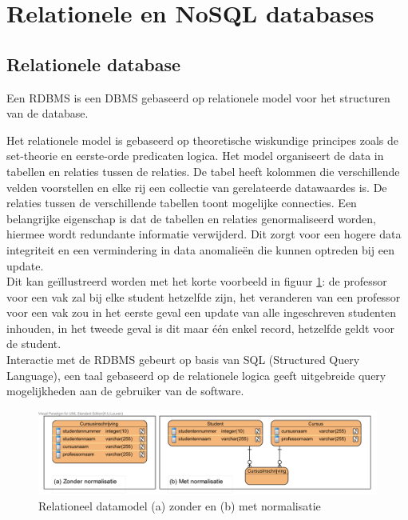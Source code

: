 \section{Relationele en NoSQL databases} 
\subsection{Relationele database}
Een R\gls{DBMS} is een \gls{DBMS} gebaseerd op relationele model voor het structuren van de database.

Het relationele model is gebaseerd op theoretische wiskundige principes zoals de set-theorie en eerste-orde predicaten logica. Het model organiseert de data in tabellen en relaties tussen de relaties. De tabel heeft kolommen die verschillende velden voorstellen en elke rij een collectie van gerelateerde datawaardes is. De relaties tussen de verschillende tabellen toont mogelijke connecties. Een belangrijke eigenschap is dat de tabellen en relaties genormaliseerd worden, hiermee wordt redundante informatie verwijderd. Dit zorgt voor een hogere data integriteit en een vermindering in data anomalieën die kunnen optreden bij een update.\cite{Elmasri:2010:FDS:1855347} \\
Dit kan geïllustreerd worden met het korte voorbeeld in figuur \ref{fig:Relationeel-Model-Normalisatie}: de professor voor een vak zal bij elke student hetzelfde zijn, het veranderen van een professor voor een vak zou in het eerste geval een update van alle ingeschreven studenten inhouden, in het tweede geval is dit maar één enkel record, hetzelfde geldt voor de student. \\
Interactie met de R\gls{DBMS} gebeurt op basis van SQL (Structured Query Language), een taal gebaseerd op de relationele logica geeft uitgebreide query mogelijkheden aan de gebruiker van de software.   
\begin{figure}[h!]
\centering
\includegraphics[width=\linewidth]{img/Relationeel-Model-Normalisatie.png}
\caption[Relationeel datamodel (a) zonder en (b) met normalisatie]{Relationeel datamodel (a) zonder en (b) met normalisatie}
\label{fig:Relationeel-Model-Normalisatie}
\end{figure}

